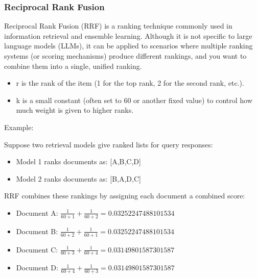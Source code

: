 \documentclass[letterpaper,11pt,english]{sphinxmanual}
\begin{document}
\subsubsection{Reciprocal Rank Fusion}
\label{\detokenize{rag:reciprocal-rank-fusion}}
\sphinxAtStartPar
Reciprocal Rank Fusion (RRF) is a ranking technique commonly used in information retrieval
and ensemble learning. Although it is not specific to large language models (LLMs), it can
be applied to scenarios where multiple ranking systems (or scoring mechanisms) produce
different rankings, and you want to combine them into a single, unified ranking.
\begin{description}
\begin{itemize}
\item {} 
\sphinxAtStartPar
r is the rank of the item (1 for the top rank, 2 for the second rank, etc.).

\item {} 
\sphinxAtStartPar
k is a small constant (often set to 60 or another fixed value) to control how much weight is given to higher ranks.

\end{itemize}

\end{description}

\sphinxAtStartPar
Example:

\sphinxAtStartPar
Suppose two retrieval models give ranked lists for query responses:
\begin{itemize}
\item {} 
\sphinxAtStartPar
Model 1 ranks documents as: {[}A,B,C,D{]}

\item {} 
\sphinxAtStartPar
Model 2 ranks documents as: {[}B,A,D,C{]}

\end{itemize}

\sphinxAtStartPar
RRF combines these rankings by assigning each document a combined score:
\begin{itemize}
\item {} 
\sphinxAtStartPar
Document A: \(\frac{1}{60+1} +\frac{1}{60+2}=0.03252247488101534\)

\item {} 
\sphinxAtStartPar
Document B: \(\frac{1}{60+2} +\frac{1}{60+1}=0.03252247488101534\)

\item {} 
\sphinxAtStartPar
Document C: \(\frac{1}{60+3} +\frac{1}{60+4}=0.03149801587301587\)

\item {} 
\sphinxAtStartPar
Document D: \(\frac{1}{60+4} +\frac{1}{60+3}=0.03149801587301587\)

\end{itemize}
\end{document}
